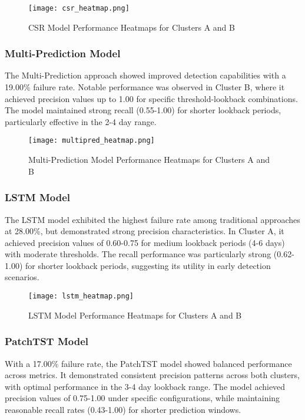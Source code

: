\documentclass{article}
\begin{document}
\clearpage
\begin{figure}[!htb]
\centering
\texttt{[image: csr\_heatmap.png]}
\caption{CSR Model Performance Heatmaps for Clusters A and B}
\label{fig:csr-heatmap}
\end{figure}

\subsubsection{Multi-Prediction Model}
The Multi-Prediction approach showed improved detection capabilities with a 19.00\% failure rate. Notable performance was observed in Cluster B, where it achieved precision values up to 1.00 for specific threshold-lookback combinations. The model maintained strong recall (0.55-1.00) for shorter lookback periods, particularly effective in the 2-4 day range.

\clearpage
\begin{figure}[!htb]
\centering
\texttt{[image: multipred\_heatmap.png]}
\caption{Multi-Prediction Model Performance Heatmaps for Clusters A and B}
\label{fig:multipred-heatmap}
\end{figure}

\subsubsection{LSTM Model}
The LSTM model exhibited the highest failure rate among traditional approaches at 28.00\%, but demonstrated strong precision characteristics. In Cluster A, it achieved precision values of 0.60-0.75 for medium lookback periods (4-6 days) with moderate thresholds. The recall performance was particularly strong (0.62-1.00) for shorter lookback periods, suggesting its utility in early detection scenarios.

\clearpage \begin{figure}[!htb]
\centering
\texttt{[image: lstm\_heatmap.png]}
\caption{LSTM Model Performance Heatmaps for Clusters A and B}
\label{fig:lstm-heatmap}
\end{figure}

\subsubsection{PatchTST Model}
With a 17.00\% failure rate, the PatchTST model showed balanced performance across metrics. It demonstrated consistent precision patterns across both clusters, with optimal performance in the 3-4 day lookback range. The model achieved precision values of 0.75-1.00 under specific configurations, while maintaining reasonable recall rates (0.43-1.00) for shorter prediction windows.
\end{document}
